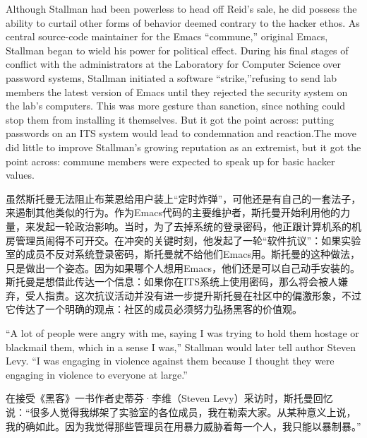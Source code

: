 \ifdefined\eng
Although Stallman had been powerless to head off Reid's sale, he did possess the ability to curtail other forms of behavior deemed contrary to the hacker ethos. As central source-code maintainer for the \ifdefined\vone Emacs ``commune,'' \fi\ifdefined\vtwo original Emacs, \fi Stallman began to wield his power for political effect. During his final stages of conflict with the administrators at the Laboratory for Computer Science over password systems, Stallman initiated a software ``strike,''\ifdefined\vone{}\fi  refusing to send lab members the latest version of Emacs until they rejected the security system on the lab's computers.\ifdefined\vtwo{} This was more gesture than sanction, since nothing could stop them from installing it themselves. But it got the point across: putting passwords on an ITS system would lead to condemnation and reaction.\fi\ifdefined\vone  The move did little to improve Stallman's growing reputation as an extremist, but it got the point across: commune members were expected to speak up for basic hacker values.\fi
\fi

\ifdefined\chs
虽然斯托曼无法阻止布莱恩给用户装上``定时炸弹''，可他还是有自己的一套法子，来遏制其他类似的行为。作为Emacs代码的主要维护者，斯托曼开始利用他的力量，来发起一轮政治影响。当时，为了去掉系统的登录密码，他正跟计算机系的机房管理员闹得不可开交。在冲突的关键时刻，他发起了一轮``软件抗议''\ifdefined\vone{}\fi ：如果实验室的成员不反对系统登录密码，斯托曼就不给他们Emacs用\ifdefined\vtwo{}。斯托曼的这种做法，只是做出一个姿态。因为如果哪个人想用Emacs，他们还是可以自己动手安装的。斯托曼是想借此传达一个信息：如果你在ITS系统上使用密码，那么将会被人嫌弃，受人指责。\fi\ifdefined\vone 这次抗议活动并没有进一步提升斯托曼在社区中的偏激形象，不过它传达了一个明确的观点：社区的成员必须努力弘扬黑客的价值观。\fi
\fi

\ifdefined\eng
``A lot of people were angry with me, saying I was trying to hold them hostage or blackmail them, which in a sense I was,'' Stallman would later tell author Steven Levy. ``I was engaging in violence against them because I thought they were engaging in violence to everyone at large.''
\fi

\ifdefined\chs
在接受《黑客》一书作者史蒂芬·李维（Steven Levy）采访时，斯托曼回忆说：``很多人觉得我绑架了实验室的各位成员，我在勒索大家。从某种意义上说，我的确如此。因为我觉得那些管理员在用暴力威胁着每一个人，我只能以暴制暴。''
\fi

